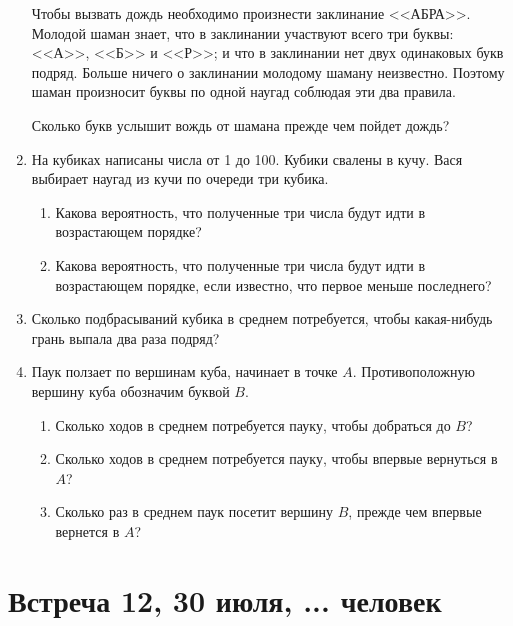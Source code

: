 \documentclass[pdftex,12pt,a4paper]{article}
\begin{document}
\begin{enumerate}
Чтобы вызвать дождь необходимо произнести заклинание <<АБРА>>. Молодой шаман знает, что в заклинании участвуют всего три буквы: <<А>>, <<Б>> и <<Р>>; и что в заклинании нет двух одинаковых букв подряд. Больше ничего о заклинании молодому шаману неизвестно. Поэтому шаман произносит буквы по одной наугад соблюдая эти два правила. 

Сколько букв услышит вождь от шамана прежде чем пойдет дождь?

\item На кубиках написаны числа от 1 до 100. Кубики свалены в кучу. Вася выбирает наугад из кучи по очереди три кубика.
\begin{enumerate}
\item Какова вероятность, что полученные три числа будут идти в возрастающем порядке?
\item Какова вероятность, что полученные три числа будут идти в возрастающем порядке, если известно, что первое меньше последнего?
\end{enumerate}

\item Сколько подбрасываний кубика в среднем потребуется, чтобы какая-нибудь грань выпала два раза подряд?

\item Паук ползает по вершинам куба, начинает в точке $A$. Противоположную вершину куба обозначим буквой $B$. 
\begin{enumerate}
\item Сколько ходов в среднем потребуется пауку, чтобы добраться до $B$?
\item Сколько ходов в среднем потребуется пауку, чтобы впервые вернуться в $A$?
\item Сколько раз в среднем паук посетит вершину $B$, прежде чем впервые вернется в $A$?
\end{enumerate}


\end{enumerate}



\newpage
\section{Встреча 12, 30 июля, ... человек}
\end{document}
